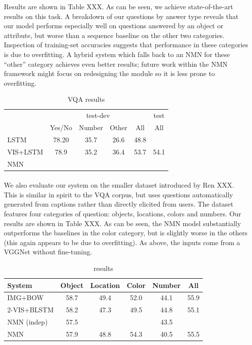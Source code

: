 \documentclass[10pt,twocolumn,letterpaper]{article}
\begin{document}
Results are shown in Table XXX. As can be seen, we achieve state-of-the-art
results on this task. A breakdown of our questions by answer type reveals that
our model performs especially well on questions answered by an object or
attribute, but worse than a sequence baseline on the other two categories.
Inspection of training-set accuracies suggests that performance in these
categories is due to overfitting. A hybrid system which falls back to an NMN
for these ``other'' category achieves even better results; future work within
the NMN framework might focus on redesigning the  module
so it is less prone to overfitting.

\begin{table}
  \footnotesize
  \center
  \begin{tabular}{lccccc}
    \toprule
    & \multicolumn{4}{c}{test-dev} & test \\
    \cmidrule(lr){2-5} \cmidrule(lr){6-6}
    & Yes/No & Number & Other & All & All \\
    \midrule
    LSTM & 78.20 & 35.7 & 26.6 & 48.8 \\
    VIS+LSTM & 78.9 & 35.2 & 36.4 & 53.7 & 54.1 \\
    NMN & \\
    \bottomrule
  \end{tabular}
  \caption{VQA results}
\end{table}

\paragraph{\cocoqa}
We also evaluate our system on the smaller \cocoqa dataset introduced by Ren
XXX. This is similar in spirit to the VQA corpus, but uses questions
automatically generated from captions rather than directly elicited from users.
The \cocoqa dataset features four categories of question: objects, locations,
colors and numbers. Our results are shown in Table XXX. As can be seen, the NMN
model substantially outperforms the baselines in the color category, but is
slightly worse in the others (this again appears to be due to overfitting).
As above, the inputs come from a VGGNet without fine-tuning.

\begin{table}
  \footnotesize
  \center
  \begin{tabular}{lccccc}
    \toprule
    System & Object & Location & Color & Number & All \\
    \midrule
    IMG+BOW & 58.7 & 49.4 & 52.0 & 44.1 & 55.9 \\
    2-VIS+BLSTM & 58.2 & 47.3 & 49.5 & 44.8 & 55.1 \\
    NMN (indep) & 57.5 & & & 43.5 & \\
    NMN & 57.9 & 48.8 & 54.3 & 40.5 & 55.5 \\
    \bottomrule
  \end{tabular}
  \caption{\cocoqa results}
\end{table}
\end{document}
